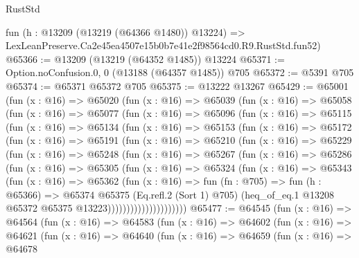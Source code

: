 \begin{lexlean}{RustStd}
\begin{coremodule}
    fun (h : @13209 (@13219 (@64366 @1480)) @13224) =>
    LexLeanPreserve.Ca2e45ea4507e15b0b7e41e2f98564cd0.R9.RustStd.fun52)
@65366 := @13209 (@13219 (@64352 @1485)) @13224
@65371 := Option.noConfusion.{0, 0} (@13188 (@64357 @1485)) @705
@65372 := @5391 @705
@65374 := @65371 @65372 @705
@65375 := @13222 @13267
@65429 := @65001
    (fun (x : @16) =>
    @65020
      (fun (x : @16) =>
      @65039
        (fun (x : @16) =>
        @65058
          (fun (x : @16) =>
          @65077
            (fun (x : @16) =>
            @65096
              (fun (x : @16) =>
              @65115
                (fun (x : @16) =>
                @65134
                  (fun (x : @16) =>
                  @65153
                    (fun (x : @16) =>
                    @65172
                      (fun (x : @16) =>
                      @65191
                        (fun (x : @16) =>
                        @65210
                          (fun (x : @16) =>
                          @65229
                            (fun (x : @16) =>
                            @65248
                              (fun (x : @16) =>
                              @65267
                                (fun (x : @16) =>
                                @65286
                                  (fun (x : @16) =>
                                  @65305
                                    (fun (x : @16) =>
                                    @65324
                                      (fun (x : @16) =>
                                      @65343
                                        (fun (x : @16) =>
                                        @65362
                                          (fun (x : @16) =>
                                          fun (fn : @705) =>
                                          fun (h : @65366) =>
                                          @65374
                                            @65375
                                            (Eq.refl.{2} (Sort 1) @705)
                                            (heq_of_eq.{1}
                                              @13208
                                              @65372
                                              @65375
                                              @13223)))))))))))))))))))))
@65477 := @64545
    (fun (x : @16) =>
    @64564
      (fun (x : @16) =>
      @64583
        (fun (x : @16) =>
        @64602
          (fun (x : @16) =>
          @64621
            (fun (x : @16) =>
            @64640
              (fun (x : @16) =>
              @64659
                (fun (x : @16) =>
                @64678

\end{coremodule}
\end{lexlean}
